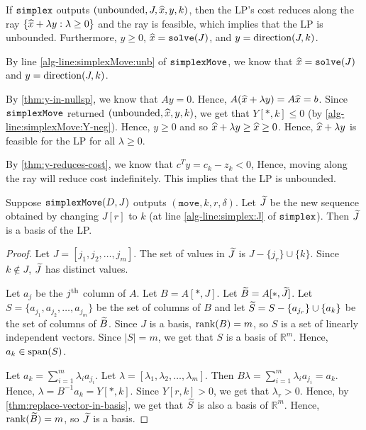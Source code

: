 \begin{theorem}
\label{thm:simplex-unbounded}
If $\operatorname{\mathtt{simplex}}$ outputs $(\textrm{unbounded}, J, \widehat{x}, y, k)$,
then the LP's cost reduces along the ray $\{\widehat{x} + \lambda y: \lambda \ge 0\}$
and the ray is feasible, which implies that the LP is unbounded.
Furthermore, $y \ge 0$, $\widehat{x} = \operatorname{\mathtt{solve}}(J)$, and $y = \operatorname{direction}(J, k)$.
\end{theorem}
\begin{longProof}
By line \cref{alg-line:simplexMove:unb} of $\operatorname{\mathtt{simplexMove}}$,
we know that $\widehat{x} = \operatorname{\mathtt{solve}}(J)$ and $y = \operatorname{direction}(J, k)$.

By \cref{thm:y-in-nullsp}, we know that $Ay = 0$.
Hence, $A(\widehat{x} + \lambda y) = A\widehat{x} = b$.
Since $\operatorname{\mathtt{simplexMove}}$ returned $(\textrm{unbounded}, \widehat{x}, y, k)$,
we get that $Y[*,k] \le 0$ (by \cref{alg-line:simplexMove:Y-neg}).
Hence, $y \ge 0$ and so $\widehat{x} + \lambda y \ge \widehat{x} \ge 0$.
Hence, $\widehat{x} + \lambda y$ is feasible for the LP for all $\lambda \ge 0$.

By \cref{thm:y-reduces-cost}, we know that $c^Ty = c_k - z_k < 0$,
Hence, moving along the ray will reduce cost indefinitely.
This implies that the LP is unbounded.
\end{longProof}

\begin{lemma}
\label{thm:simplex-new-basis}
Suppose $\operatorname{\mathtt{simplexMove}}(D, J)$ outputs $(\mathtt{move}, k, r, \delta)$.
Let $\widetilde{J}$ be the new sequence obtained by changing $J[r]$ to $k$
(at line \ref{alg-line:simplex:J} of $\operatorname{\mathtt{simplex}}$).
Then $\widetilde{J}$ is a basis of the LP.
\end{lemma}
\begin{proof}
Let $J = [j_1, j_2, \ldots, j_m]$.
The set of values in $\widetilde{J}$ is $J - \{j_r\} \cup \{k\}$.
Since $k \not\in J$, $\widetilde{J}$ has distinct values.

Let $a_j$ be the $j^{\textrm{th}}$ column of $A$. Let $B = A[*,J]$. Let $\widetilde{B} = A[*,\widetilde{J}]$.
Let $S = \{a_{j_1}, a_{j_2}, \ldots, a_{j_m}\}$ be the set of columns of $B$
and let $\widetilde{S} = S - \{a_{j_r}\} \cup \{a_k\}$ be the set of columns of $\widetilde{B}$.
Since $J$ is a basis, $\operatorname{rank}(B) = m$, so $S$ is a set of linearly independent vectors.
Since $|S| = m$, we get that $S$ is a basis of $\mathbb{R}^m$. Hence, $a_k \in \operatorname{span}(S)$.

Let $a_k = \sum_{i=1}^m \lambda_i a_{j_i}$. Let $\lambda = [\lambda_1, \lambda_2, \ldots, \lambda_m]$.
Then $B\lambda = \sum_{i=1}^m \lambda_i a_{j_i} = a_k$.
Hence, $\lambda = B^{-1}a_k = Y[*,k]$.
Since $Y[r,k] > 0$, we get that $\lambda_r > 0$.
Hence, by \cref{thm:replace-vector-in-basis}, we get that
$\widetilde{S}$ is also a basis of $\mathbb{R}^m$.
Hence, $\operatorname{rank}(\widetilde{B}) = m$, so $\widetilde{J}$ is a basis.
\end{proof}

